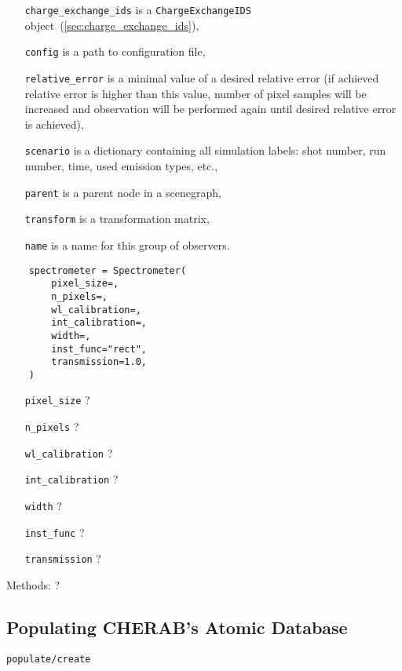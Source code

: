 \documentclass[../main.tex]{subfiles}
\begin{document}
\begin{itemize}[align=left]
    \item[\texttt{charge\_exchange\_ids}] is a \texttt{ChargeExchangeIDS} object~(\cref{sec:charge_exchange_ids}),
    \item[\texttt{config}] is a path to configuration file,
    \item[\texttt{relative\_error}] is a minimal value of a desired relative error (if achieved relative error is higher than this value, number of pixel samples will be increased and observation will be performed again until desired relative error is achieved),
    \item[\texttt{scenario}] is a dictionary containing all simulation labels: shot number, run number, time, used emission types, etc.,
    \item[\texttt{parent}] is a parent node in a scenegraph,
    \item[\texttt{transform}] is a transformation matrix,
    \item[\texttt{name}] is a name for this group of observers.
\end{itemize}

\begin{verbatim}
    spectrometer = Spectrometer(
        pixel_size=,
        n_pixels=,
        wl_calibration=,
        int_calibration=,
        width=,
        inst_func="rect",
        transmission=1.0,
    )
\end{verbatim}

\begin{itemize}[align=left]
    \item[\texttt{pixel\_size}] ?
    \item[\texttt{n\_pixels}] ?
    \item[\texttt{wl\_calibration}] ?
    \item[\texttt{int\_calibration}] ?
    \item[\texttt{width}] ?
    \item[\texttt{inst\_func}] ?
    \item[\texttt{transmission}] ?
\end{itemize}

Methods: ?

\subsection{Populating CHERAB's Atomic Database}%
\label{sec:atomic}

\texttt{populate/create}
\end{document}
